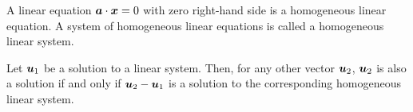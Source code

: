 \begin{definition}
  A linear equation ${\bm{a}}\cdot{\bm{x}} = 0$ with zero right-hand side is a homogeneous linear equation. A system of homogeneous linear equations is called a homogeneous linear system.
\end{definition}

\begin{lemma}
  Let ${\bm{u}}_1$ be a solution to a linear system. Then, for any other vector ${\bm{u}}_2$, ${\bm{u}}_2$ is also a solution if and only if ${\bm{u}}_2-{\bm{u}}_1$ is a solution to the corresponding homogeneous linear system.
\end{lemma}

